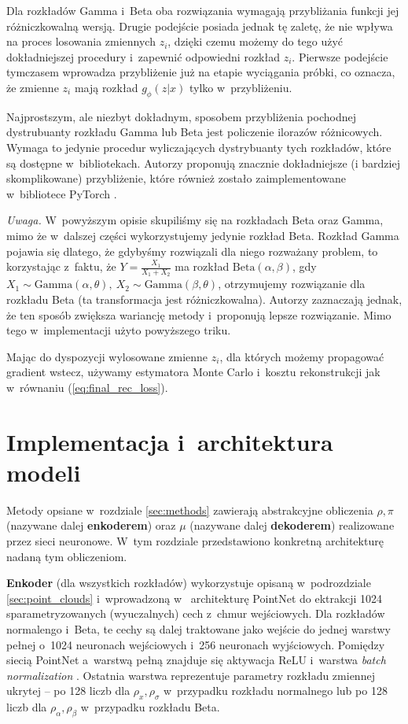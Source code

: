 \documentclass{iithesis}
\begin{document}
Dla rozkładów Gamma i~Beta oba rozwiązania wymagają przybliżania funkcji
jej różniczkowalną wersją. Drugie podejście posiada jednak tę zaletę,
że nie wpływa na proces losowania zmiennych $z_i$, dzięki czemu możemy do tego użyć
dokładniejszej procedury i~zapewnić odpowiedni rozkład $z_i$. Pierwsze podejście
tymczasem wprowadza przybliżenie już na etapie wyciągania próbki, co oznacza, że zmienne
$z_i$ mają rozkład $g_\phi(z|x)$ tylko w~przybliżeniu.

Najprostszym, ale niezbyt dokładnym, sposobem przybliżenia pochodnej dystrubuanty
rozkładu Gamma lub Beta jest policzenie ilorazów różnicowych.
Wymaga to jedynie procedur wyliczających dystrybuanty tych rozkładów, które są dostępne w~bibliotekach.
Autorzy \cite{pathwise_gradients} proponują znacznie dokładniejsze (i bardziej skomplikowane)
przybliżenie, które również zostało zaimplementowane w~bibliotece PyTorch \cite{pytorch}.

\noindent \textit{Uwaga.} W~powyższym opisie skupiliśmy się na rozkładach Beta oraz Gamma,
mimo że w~dalszej części wykorzystujemy jedynie rozkład Beta. Rozkład Gamma pojawia się dlatego,
że gdybyśmy rozwiązali dla niego rozważany problem, to korzystając z~faktu, że $Y = \frac{X_1}{X_1+X_2}$
ma rozkład $\text{Beta}(\alpha,\beta)$, gdy $X_1 \sim \text{Gamma}(\alpha,\theta),\ X_2 \sim \text{Gamma}(\beta,\theta)$,
otrzymujemy rozwiązanie dla rozkładu Beta (ta transformacja jest różniczkowalna).
Autorzy \cite{pathwise_gradients} zaznaczają jednak, że ten sposób zwiększa wariancję metody
i~proponują lepsze rozwiązanie. Mimo tego w~implementacji użyto powyższego triku.

Mając do dyspozycji wylosowane zmienne $z_i$, dla których możemy propagować gradient
wstecz, używamy estymatora Monte Carlo i~kosztu rekonstrukcji jak w~równaniu (\ref{eq:final_rec_loss}).

\chapter{Implementacja i~architektura modeli}
Metody opsiane w~rozdziale \ref{sec:methods} zawierają
abstrakcyjne obliczenia $\rho,\pi$ (nazywane dalej \textbf{enkoderem}) oraz $\mu$
(nazywane dalej \textbf{dekoderem}) realizowane przez sieci neuronowe.
W~tym rozdziale przedstawiono konkretną architekturę nadaną tym obliczeniom.

\textbf{Enkoder} (dla wszystkich rozkładów) wykorzystuje opisaną w~podrozdziale
\ref{sec:point_clouds} i~wprowadzoną w~\cite{pointnet} architekturę PointNet do ektrakcji
1024 sparametryzowanych (wyuczalnych) cech z~chmur wejściowych.
Dla rozkładów normalengo i~Beta, te cechy są dalej traktowane jako wejście do
jednej warstwy pełnej o~1024 neuronach wejściowych
i~256 neuronach wyjściowych. Pomiędzy siecią PointNet a~warstwą pełną znajduje się aktywacja ReLU
i~warstwa \textit{batch normalization} \cite{batch_normalization}.
Ostatnia warstwa reprezentuje parametry rozkładu zmiennej ukrytej --
po 128 liczb dla $\rho_x,\rho_\sigma$ w~przypadku rozkładu normalnego lub po 128 liczb
dla $\rho_\alpha,\rho_\beta$ w~przypadku rozkładu Beta.
\end{document}
